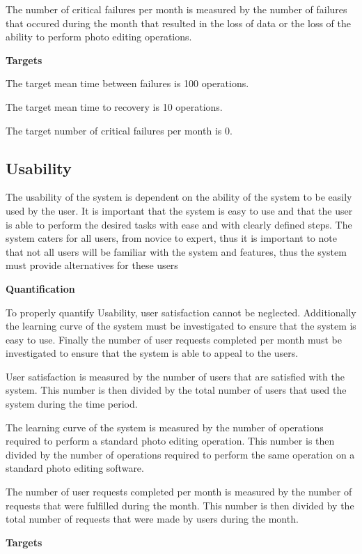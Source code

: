 \documentclass[11pt,a4paper]{article}
\begin{document}
The number of critical failures per month is measured by the number of failures that occured during the month that resulted in the loss of data or the loss of the ability to perform photo editing operations.

    {\bf Targets}

The target mean time between failures is 100 operations.

The target mean time to recovery is 10 operations.

The target number of critical failures per month is 0.



\subsection*{Usability}

The usability of the system is dependent on the ability of the system to be easily used by the user. It is important that the system is easy to use and that the
user is able to perform the desired tasks with ease and with clearly defined steps. The system caters for all users, from novice to expert, thus it is important to note that not all users
will be familiar with the system and features, thus the system must provide alternatives for these users

    {\bf Quantification}

To properly quantify Usability, user satisfaction cannot be neglected. Additionally the learning curve of the system must be investigated to ensure that the system is easy to use.
Finally the number of user requests completed per month must be investigated to ensure that the system is able to appeal to the users.

User satisfaction is measured by the number of users that are satisfied with the system. This number is then divided by the total number of users that used the system during the time period.

The learning curve of the system is measured by the number of operations required to perform a standard photo editing operation. This number is then divided by the number of operations required to perform the same operation on a standard photo editing software.

The number of user requests completed per month is measured by the number of requests that were fulfilled during the month. This number is then divided by the total number of requests that were made by users during the month.

    {\bf Targets}
\end{document}
